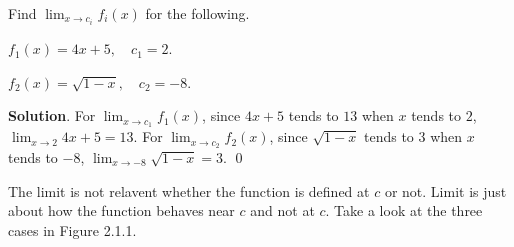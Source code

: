 \documentclass[11pt]{book}
\begin{document}
\begin{example}
    Find $\displaystyle\lim_{x\to c_i}f_i(x)$ for the following.
    \begin{enumerate}
        \vspace*{-1em}
        \begin{multicols}{2}
            \item $f_1(x)=4x+5, \quad c_1=2$.
            \item $f_2(x)=\sqrt{1-x}, \quad c_2=-8$.
        \end{multicols}
        \vspace{0.1em}
    \end{enumerate}
\end{example}
\textbf{Solution}. For $\displaystyle\lim_{x\to c_1}f_1(x)$, since $4x+5$ tends to $13$ when $x$ tends to $2$, $\displaystyle\lim_{x\to 2}4x+5=13$. For $\displaystyle\lim_{x\to c_2}f_2(x)$, since $\sqrt{1-x}$ tends to $3$ when $x$ tends to $-8$, $\displaystyle\lim_{x\to -8}\sqrt{1-x}=3$. \qed

The limit is not relavent whether the function is defined at $c$ or not. Limit is just about how the function behaves near $c$ and not at $c$. Take a look at the three cases in Figure 2.1.1. 
\end{document}
